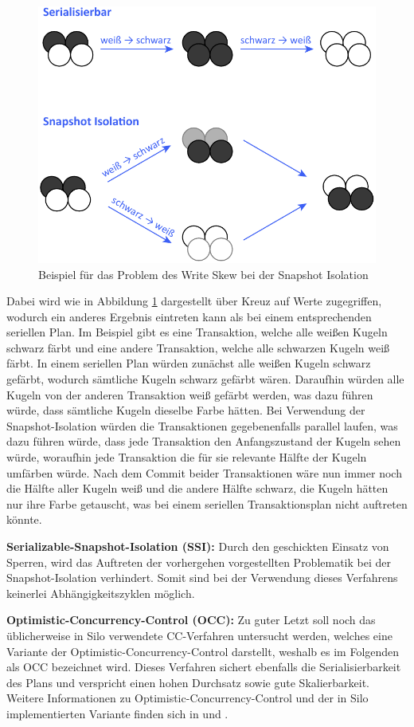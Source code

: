 \begin{figure}
	\includegraphics[width=0.8\columnwidth]{img/write_skew.pdf}
	\caption{Beispiel für das Problem des Write Skew bei der Snapshot Isolation \cite{write_skew}}
	\label{fig:write_skew}
\end{figure}

Dabei wird wie in Abbildung \ref{fig:write_skew} dargestellt über Kreuz auf Werte zugegriffen, wodurch ein anderes Ergebnis eintreten kann als bei einem entsprechenden seriellen Plan.
Im Beispiel gibt es eine Transaktion, welche alle weißen Kugeln schwarz färbt und eine andere Transaktion, welche alle schwarzen Kugeln weiß färbt.
In einem seriellen Plan würden zunächst alle weißen Kugeln schwarz gefärbt, wodurch sämtliche Kugeln schwarz gefärbt wären.
Daraufhin würden alle Kugeln von der anderen Transaktion weiß gefärbt werden, was dazu führen würde, dass sämtliche Kugeln dieselbe Farbe hätten.
Bei Verwendung der Snapshot-Isolation würden die Transaktionen gegebenenfalls parallel laufen, was dazu führen würde, dass jede Transaktion den Anfangszustand der Kugeln sehen würde, woraufhin jede Transaktion die für sie relevante Hälfte der Kugeln umfärben würde.
Nach dem Commit beider Transaktionen wäre nun immer noch die Hälfte aller Kugeln weiß und die andere Hälfte schwarz, die Kugeln hätten nur ihre Farbe getauscht, was bei einem seriellen Transaktionsplan nicht auftreten könnte.

\textbf{Serializable-Snapshot-Isolation (SSI):} Durch den geschickten Einsatz von Sperren, wird das Auftreten der vorhergehen vorgestellten Problematik bei der Snapshot-Isolation verhindert.
Somit sind bei der Verwendung dieses Verfahrens keinerlei Abhängigkeitszyklen möglich.

\textbf{Optimistic-Concurrency-Control (OCC):} Zu guter Letzt soll noch das üblicherweise in Silo verwendete CC-Verfahren untersucht werden, welches eine Variante der Optimistic-Concurrency-Control darstellt, weshalb es im Folgenden als OCC bezeichnet wird.
Dieses Verfahren sichert ebenfalls die Serialisierbarkeit des Plans und verspricht einen hohen Durchsatz sowie gute Skalierbarkeit.
Weitere Informationen zu Optimistic-Concurrency-Control und der in Silo implementierten Variante finden sich in \cite{Kung:1981} und \cite{Tu:2013}.

